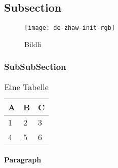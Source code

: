 \lipsum[1] \cite{quelle2}

\subsection{Subsection}
\lipsum[1] \cite{quelle1}

\begin{figure}[H]
\centering
\texttt{[image: de-zhaw-init-rgb]}
\caption{Bildli}
\label{fig:bildli1}
\end{figure}


\subsubsection{SubSubSection}
\lipsum[1]
\begin{table}[H]
\centering
\caption{Eine Tabelle}
\label{tab:my-table}
\begin{tabular}{|l|l|l|}
\hline
\textbf{A} & \textbf{B} & \textbf{C} \\ \hline
1          & 2          & 3          \\ \hline
4          & 5          & 6          \\ \hline
\end{tabular}
\end{table}

\paragraph{Paragraph}
\lipsum[1]

 


